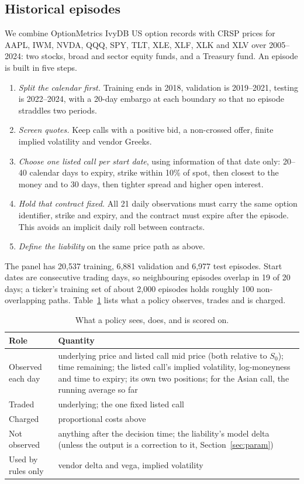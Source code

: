 \documentclass[10pt,conference]{IEEEtran}
\begin{document}
\subsection{Historical episodes}
We combine OptionMetrics IvyDB US option records with CRSP prices
\cite{wrdsOptionMetrics,crspStock} for AAPL, IWM, NVDA, QQQ, SPY, TLT, XLE,
XLF, XLK and XLV over 2005--2024: two stocks, broad and sector equity funds,
and a Treasury fund. An episode is built in five steps.
\begin{enumerate}
\item \emph{Split the calendar first.} Training ends in 2018, validation is
2019--2021, testing is 2022--2024, with a 20-day embargo at each boundary so
that no episode straddles two periods.
\item \emph{Screen quotes.} Keep calls with a positive bid, a non-crossed
offer, finite implied volatility and vendor Greeks.
\item \emph{Choose one listed call per start date}, using information of that
date only: 20--40 calendar days to expiry, strike within 10\% of spot, then
closest to the money and to 30 days, then tighter spread and higher open
interest.
\item \emph{Hold that contract fixed.} All 21 daily observations must carry
the same option identifier, strike and expiry, and the contract must expire
after the episode. This avoids an implicit daily roll between contracts.
\item \emph{Define the liability} on the same price path as above.
\end{enumerate}
The panel has 20,537 training, 6,881 validation and 6,977 test episodes.
Start dates are consecutive trading days, so neighbouring episodes overlap in
19 of 20 days; a ticker's training set of about 2,000 episodes holds roughly
100 non-overlapping paths. Table~\ref{tab:roles} lists what a policy observes,
trades and is charged.

\begin{table}[t]
\caption{What a policy sees, does, and is scored on.}
\label{tab:roles}
\centering
\footnotesize
\begin{tabular}{@{}p{}p{}@{}}
\toprule
Role & Quantity \\
\midrule
Observed each day & underlying price and listed call mid price (both relative
to $S_0$); time remaining; the listed call's implied volatility,
log-moneyness and time to expiry; its own two positions; for the Asian call,
the running average so far \\
Traded & underlying; the one fixed listed call \\
Charged & proportional costs above \\
Not observed & anything after the decision time; the liability's model delta
(unless the output is a correction to it, Section~\ref{sec:param}) \\
Used by rules only & vendor delta and vega, implied volatility \\
\bottomrule
\end{tabular}
\end{table}
\end{document}
